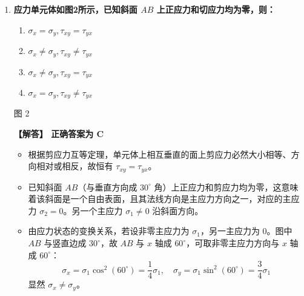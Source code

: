 \documentclass[11pt,a4paper]{ctexrep}
\begin{document}
{\begin{enumerate}


\item \textbf{应力单元体如图2所示，已知斜面 $AB$ 上正应力和切应力均为零，则：}
\begin{enumerate}[label=\Alph*.]
    \item $\sigma_x = \sigma_y, \tau_{xy} = \tau_{yx}$
    \item $\sigma_x \neq \sigma_y, \tau_{xy} \neq \tau_{yx}$
    \item $\sigma_x \neq \sigma_y, \tau_{xy} = \tau_{yx}$
    \item $\sigma_x = \sigma_y, \tau_{xy} \neq \tau_{yx}$
\end{enumerate}

\begin{center}
\par\small 图 2
\end{center}

\textbf{【解答】 正确答案为 C}
\begin{itemize}
    \item 根据剪应力互等定理，单元体上相互垂直的面上剪应力必然大小相等、方向相对或相反，故恒有 $\tau_{xy} = \tau_{yx}$。
    \item 已知斜面 $AB$（与垂直方向成 $30^\circ$ 角）上正应力和剪应力均为零，这意味着该斜面是一个自由表面，且其法线方向是主应力方向之一，对应的主应力 $\sigma_2 = 0$。另一个主应力 $\sigma_1 \neq 0$ 沿斜面方向。
    \item 由应力状态的变换关系，若设非零主应力为 $\sigma_1$，另一主应力为 0。图中 $AB$ 与竖直边成 $30^\circ$，故 $AB$ 与 $x$ 轴成 $60^\circ$，可取非零主应力方向与 $x$ 轴成 $60^\circ$：
    \[
    \sigma_x = \sigma_1 \cos^2(60^\circ) = \frac{1}{4}\sigma_1,\quad \sigma_y = \sigma_1 \sin^2(60^\circ) = \frac{3}{4}\sigma_1
    \]
    显然 $\sigma_x \neq \sigma_y$。
\end{itemize}


\end{enumerate}}
\end{document}
